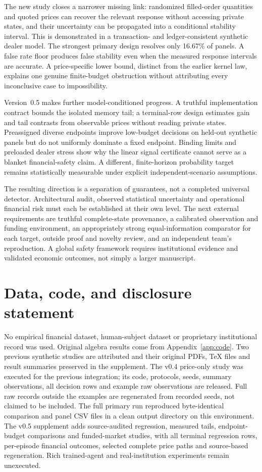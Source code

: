 \documentclass[11pt,a4paper]{article}
\theoremstyle{definition}
\theoremstyle{remark}
\begin{document}
The new study closes a narrower missing link: randomized filled-order quantities and quoted prices can recover the relevant response without accessing private states, and their uncertainty can be propagated into a conditional stability interval. This is demonstrated in a transaction- and ledger-consistent synthetic dealer model. The strongest primary design resolves only 16.67\% of panels. A false rate floor produces false stability even when the measured response intervals are accurate. A price-specific lower bound, distinct from the earlier kernel law, explains one genuine finite-budget obstruction without attributing every inconclusive case to impossibility.

Version~0.5 makes further model-conditioned progress. A truthful implementation contract bounds the isolated memory tail; a terminal-row design estimates gain and tail contrasts from observable prices without reading private states. Preassigned diverse endpoints improve low-budget decisions on held-out synthetic panels but do not uniformly dominate a fixed endpoint. Binding limits and preloaded dealer stress show why the linear signal certificate cannot serve as a blanket financial-safety claim. A different, finite-horizon probability target remains statistically measurable under explicit independent-scenario assumptions.

The resulting direction is a separation of guarantees, not a completed universal detector. Architectural audit, observed statistical uncertainty and operational financial risk must each be established at their own level. The next external requirements are truthful complete-state provenance, a calibrated observation and funding environment, an appropriately strong equal-information comparator for each target, outside proof and novelty review, and an independent team's reproduction. A global safety framework requires institutional evidence and validated economic outcomes, not simply a larger manuscript.

\section*{Data, code, and disclosure statement}
No empirical financial dataset, human-subject dataset or proprietary institutional record was used. Original algebra results come from Appendix~\ref{app:code}. Two previous synthetic studies are attributed and their original PDFs, TeX files and result summaries preserved in the supplement. The v0.4 price-only study was executed for the previous integration; its code, protocols, seeds, summary observations, all decision rows and example raw observations are released. Full raw records outside the examples are regenerated from recorded seeds, not claimed to be included. The full primary run reproduced byte-identical comparison and panel CSV files in a clean output directory on this environment. The v0.5 supplement adds source-audited regression, measured tails, endpoint-budget comparisons and funded-market studies, with all terminal regression rows, per-episode financial outcomes, selected complete price paths and source-based regeneration. Rich trained-agent and real-institution experiments remain unexecuted.
\end{document}
